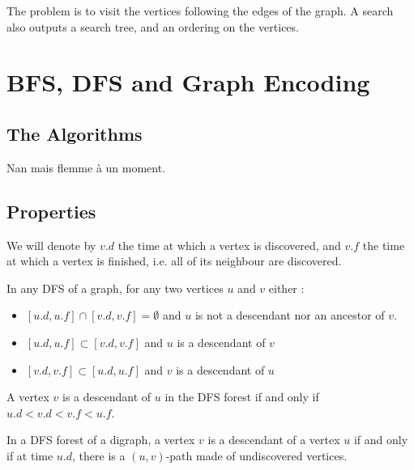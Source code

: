 \documentclass{cours}
\begin{document}
\begin{definition}
    The problem is to visit the vertices following the edges of the graph. A search also outputs a search tree, and an ordering on the vertices.
\end{definition}

\section{BFS, DFS and Graph Encoding}
\subsection{The Algorithms}
Nan mais flemme à un moment.\\

\subsection{Properties}
\begin{definition}
    We will denote by $v.d$ the time at which a vertex is discovered, and $v.f$ the time at which a vertex is finished, i.e. all of its neighbour are discovered.
\end{definition}
\begin{theorem}
    In any DFS of a graph, for any two vertices $u$ and $v$ either :
    \begin{itemize}
        \item $\left[u.d, u.f\right]\cap \left[v.d, v.f\right] = \emptyset$ and $u$ is not a descendant nor an ancestor of $v$.
        \item $\left[u.d, u.f\right] \subset \left[v.d, v.f\right]$ and $u$ is a descendant of $v$
        \item $\left[v.d, v.f\right] \subset \left[u.d, u.f\right]$ and $v$ is a descendant of $u$
    \end{itemize}
\end{theorem}

\begin{corollary}
    A vertex $v$ is a descendant of $u$ in the DFS forest if and only if $u.d < v.d < v.f < u.f$.
\end{corollary}

\begin{theorem}
    In a DFS forest of a digraph, a vertex $v$ is a descendant of a vertex $u$ if and only if at time $u.d$, there is a $(u, v)$-path made of undiscovered vertices.
\end{theorem}
\end{document}
